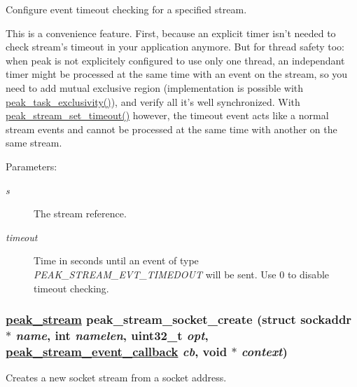 Configure event timeout checking for a specified stream. 

This is a convenience feature. First, because an explicit timer isn't needed to check stream's timeout in your application anymore. But for thread safety too: when peak is not explicitely configured to use only one thread, an independant timer might be processed at the same time with an event on the stream, so you need to add mutual exclusive region (implementation is possible with \hyperlink{group__task__sync_ga21}{peak\_\-task\_\-exclusivity()}), and verify all it's well synchronized. With \hyperlink{group__stream__common_ga53}{peak\_\-stream\_\-set\_\-timeout()} however, the timeout event acts like a normal stream events and cannot be processed at the same time with another on the same stream.

\begin{Desc}
\item[Parameters:]
\begin{description}
\item[{\em s}]The stream reference. \item[{\em timeout}]Time in seconds until an event of type {\em PEAK\_\-STREAM\_\-EVT\_\-TIMEDOUT\/} will be sent. Use 0 to disable timeout checking. \end{description}
\end{Desc}
\hypertarget{group__stream__common_ga0}{
\subsubsection[peak\_\-stream\_\-socket\_\-create]{\setlength{\rightskip}{0pt plus 5cm}\hyperlink{group__stream_ga0}{peak\_\-stream} peak\_\-stream\_\-socket\_\-create (struct sockaddr $\ast$ {\em name}, int {\em namelen}, uint32\_\-t {\em opt}, \hyperlink{group__stream_ga1}{peak\_\-stream\_\-event\_\-callback} {\em cb}, void $\ast$ {\em context})}}
\label{group__stream__common_ga0}


Creates a new socket stream from a socket address. 

